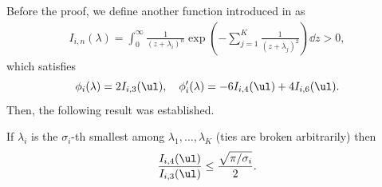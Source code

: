 Before the proof, we define another function introduced in \citet{pmlr-v201-honda23a} as
\begin{align}\label{eq: def of I}
    I_{i,n}(\lambda) = \int_0^\infty \frac{1}{(z+\lambda_i)^n} \exp(-\sum_{j=1}^K \frac{1}{(z+\lambda_j)^2}) \dd z>0,
\end{align}
which satisfies
\begin{equation}\label{def: phi and phi'}
    \phi_i(\lambda) = 2I_{i,3}(\ul) , \quad \phi_i'(\lambda) = -6I_{i,4}(\ul) + 4I_{i,6}(\ul).
\end{equation}
Then, the following result was established.
\begin{lemma}\label{lem: hnd I ratio}
    If $\lambda_i$ is the $\sigma_i$-th smallest among $\lambda_1, \ldots, \lambda_K$ (ties are broken arbitrarily) then
    \begin{equation*}
        \frac{I_{i,4}(\ul)}{I_{i,3}(\ul)} \leq \frac{\sqrt{\pi/\sigma_i}}{2}.
    \end{equation*}
\end{lemma}
